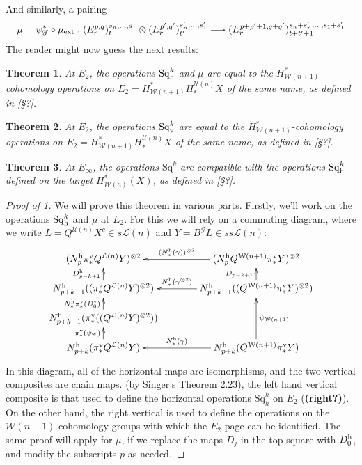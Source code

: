 \documentclass[11pt]{amsart}
\theoremstyle{plain}
\newtheorem{thm}{Theorem}[section]
\theoremstyle{definition}
\renewcommand{\to}{\longrightarrow}
\newcommand{\scrG}{\mathscr{G}}
\newcommand{\calW}{\mathcal{W}}
\newcommand{\calU}{\mathcal{U}}
\newcommand{\calL}{\mathcal{L}}
\theoremstyle{plain}
\newcommand{\BSW}{{\scrG}}
\newcommand{\BSWres}{B^\BSW}%
\newcommand{\ExtCohProd}{\mu_\textup{ext}}
\newcommand{\Sq}{\mathrm{Sq}}
\newcommand{\Sqh}{\mathrm{Sq}_\textup{h}}
\newcommand{\Sqv}{\mathrm{Sq}_\textup{v}}
\begin{document}
\begin{Composite functor spectral sequences}
And similarly, a pairing
\[\mu=\psi_{\BSW}^*\circ\ExtCohProd:(E^{p,q}_r)^{s_n,\ldots,s_1}_t\otimes (E^{p',q'}_r)^{s'_n,\ldots,s'_1}_{t'}\to (E^{p+p'+1,q+q'}_r)^{s_n+s'_n,\ldots,s_1+s'_1}_{t+t'+1}\]
The reader might now guess the next results:
\begin{thm}\label{E2CompFuncLieOperationsID}
At $E_2$, the operations $\Sqh^k$ and $\mu$ are equal to the $H^*_{\calW(n+1)}$-cohomology operations on $E_2=H^*_{\calW(n+1)}H_*^{\calU(n)}X$ of the same name, as defined in [\S?].
\end{thm}
\begin{thm}\label{E2CompFuncKosOperationsID}
At $E_2$, the operations $\Sqv^k$ are equal to the $H^*_{\calW(n+1)}$-cohomology operations on $E_2=H^*_{\calW(n+1)}H_*^{\calU(n)}X$ of the same name, as defined in [\S?].
\end{thm}
\begin{thm}\label{EInftyCompFuncOperationsID}
At $E_\infty$, the operations $\Sq^k$ are compatible with the operations $\Sqh^k$ defined on the target $H^*_{\calW(n)}(X)$, as defined in [\S?].
\end{thm} 
\begin{tricky proofs of operation compatibilities}
\begin{proof}[Proof of \ref{E2CompFuncLieOperationsID}]
We will prove this theorem in various parts. Firstly, we'll work on the operations $\Sqh^k$ and $\mu$ at $E_2$.
For this we will rely on a commuting diagram, where we write $L=Q^{\calU(n)}X^c\in s\calL(n)$ and $Y=\BSWres L\in ss\calL(n)$:
\[\xymatrix@C=13mm@R=4mm{
(N_p^\textup{h}\pi_*^{\textup{v}}Q^{\calL(n)}Y)^{\otimes2}&%
(N_p^\textup{h}Q^{\calW(n+1)}\pi_*^{\textup{v}}Y)^{\otimes2}
\ar[l]_-{(N^\textup{h}_*(\gamma))^{\otimes 2}}
\\%
N_{p+k-1}^\textup{h}((\pi_*^{\textup{v}}Q^{\calL(n)}Y)^{\otimes2})
\ar[u]^-{D_{p-k+1}^\textup{h}}
&%
N_{p+k-1}^\textup{h}((Q^{\calW(n+1)}\pi_*^{\textup{v}}Y)^{\otimes2})
\ar[u]^-{D_{p-k+1}}
\ar[l]_-{N^\textup{h}_*(\gamma^{\otimes 2})}
\\%
N_{p+k-1}^\textup{h}(\pi_*^{\textup{v}}((Q^{\calL(n)}Y)^{\otimes2}))
\ar[u]^-{N^\textup{h}_*\pi_*^\textup{v}(D_0^\textup{v})}
&%
\\%
N^\textup{h}_{p+k}(\pi_*^{\textup{v}} Q^{\calL(n)}Y)
\ar[u]^-{\pi_*^\textup{v}(\psi_{\BSW})}
&%
N^\textup{h}_{p+k}(Q^{\calW(n+1)}\pi_*^{\textup{v}} Y)
\ar[uu]_-{\psi_{\calW(n+1)}}
\ar[l]_-{N^\textup{h}_*(\gamma)}
}\]
In this diagram, all of the horizontal maps are isomorphisms, and the two vertical composites are chain maps. (by Singer's Theorem 2.23),  the left hand vertical composite is that used to define the horizontal operations $\Sq^{k}_h$ on $E_2$ (\textbf{(right?)}). On the other hand, the right vertical is used to define the operations on the $\calW(n+1)$-cohomology groups with which the $E_2$-page can be identified. The same proof will apply for $\mu$, if we replace the maps $D_j$ in the top square with $D_0^\textup{h}$, and modify the subscripts $p$ as needed.


\end{proof}
\end{tricky proofs of operation compatibilities}
\end{Composite functor spectral sequences}
\end{document}
